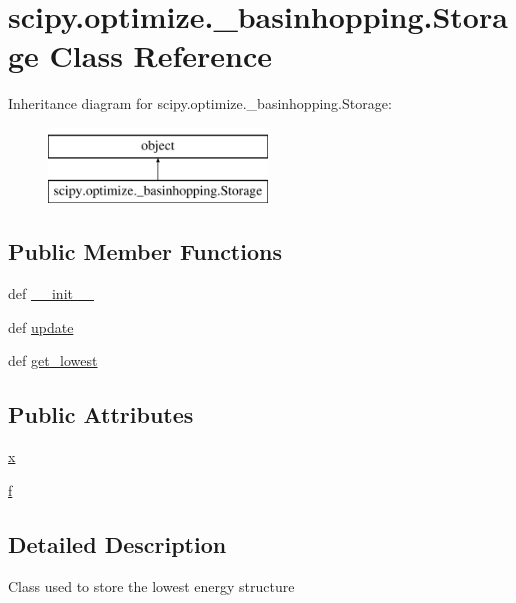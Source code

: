 \hypertarget{classscipy_1_1optimize_1_1__basinhopping_1_1Storage}{}\section{scipy.\+optimize.\+\_\+basinhopping.\+Storage Class Reference}
\label{classscipy_1_1optimize_1_1__basinhopping_1_1Storage}
Inheritance diagram for scipy.\+optimize.\+\_\+basinhopping.\+Storage\+:\begin{figure}[H]
\begin{center}
\leavevmode
\includegraphics[height=2.000000cm]{classscipy_1_1optimize_1_1__basinhopping_1_1Storage}
\end{center}
\end{figure}
\subsection*{Public Member Functions}
\begin{DoxyCompactItemize}
\item 
def \hyperlink{classscipy_1_1optimize_1_1__basinhopping_1_1Storage_a84f2eea9da93535453f726878e9d1552}{\+\_\+\+\_\+init\+\_\+\+\_\+}
\item 
def \hyperlink{classscipy_1_1optimize_1_1__basinhopping_1_1Storage_aa9e0c3b7481e3d9b82978e99144e9682}{update}
\item 
def \hyperlink{classscipy_1_1optimize_1_1__basinhopping_1_1Storage_ac9b35be2b982fcfd16ddd8156ced4b97}{get\+\_\+lowest}
\end{DoxyCompactItemize}
\subsection*{Public Attributes}
\begin{DoxyCompactItemize}
\item 
\hyperlink{classscipy_1_1optimize_1_1__basinhopping_1_1Storage_a95ce932ab88fd6343fc62d38dee59faa}{x}
\item 
\hyperlink{classscipy_1_1optimize_1_1__basinhopping_1_1Storage_acd9144b9b6a9be359c15ec7b7dcbd722}{f}
\end{DoxyCompactItemize}


\subsection{Detailed Description}
\begin{DoxyVerb}Class used to store the lowest energy structure
\end{DoxyVerb}
 

